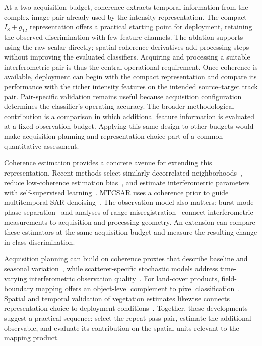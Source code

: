 At a two-acquisition budget, coherence extracts temporal information from the complex image pair already used by the intensity representation. The compact $I_8{+}g_{12}$ representation offers a practical starting point for deployment, retaining the observed discrimination with few feature channels. The ablation supports using the raw scalar directly; spatial coherence derivatives add processing steps without improving the evaluated classifiers. Acquiring and processing a suitable interferometric pair is thus the central operational requirement. Once coherence is available, deployment can begin with the compact representation and compare its performance with the richer intensity features on the intended source--target track pair. Pair-specific validation remains useful because acquisition configuration determines the classifier's operating accuracy. The broader methodological contribution is a comparison in which additional feature information is evaluated at a fixed observation budget. Applying this same design to other budgets would make acquisition planning and representation choice part of a common quantitative assessment.

Coherence estimation provides a concrete avenue for extending this representation. Recent methods select similarly decorrelated neighborhoods~\cite{Yao2024}, reduce low-coherence estimation bias~\cite{LiangH2026}, and estimate interferometric parameters with self-supervised learning~\cite{Geara2025}. MTCSAR uses a coherence prior to guide multitemporal SAR denoising~\cite{LiuJ2025}. The observation model also matters: burst-mode phase separation~\cite{Pulella2024} and analyses of range misregistration~\cite{Yang2026} connect interferometric measurements to acquisition and processing geometry. An extension can compare these estimators at the same acquisition budget and measure the resulting change in class discrimination.

Acquisition planning can build on coherence proxies that describe baseline and seasonal variation~\cite{Xu2025}, while scatterer-specific stochastic models address time-varying interferometric observation quality~\cite{Brouwer2025}. For land-cover products, field-boundary mapping offers an object-level complement to pixel classification~\cite{Celik2026}. Spatial and temporal validation of vegetation estimates likewise connects representation choice to deployment conditions~\cite{WangX2025}. Together, these developments suggest a practical sequence: select the repeat-pass pair, estimate the additional observable, and evaluate its contribution on the spatial units relevant to the mapping product.

